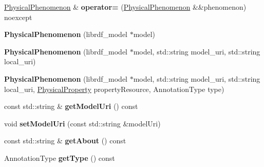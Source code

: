 \begin{DoxyCompactItemize}
\mbox{\label{classomexmeta_1_1PhysicalPhenomenon_af15355b4c2a361b4b02dca02d3877aed}} 
\hyperlink{classomexmeta_1_1PhysicalPhenomenon}{Physical\+Phenomenon} \& {\bfseries operator=} (\hyperlink{classomexmeta_1_1PhysicalPhenomenon}{Physical\+Phenomenon} \&\&phenomenon) noexcept
\item 
\mbox{\label{classomexmeta_1_1PhysicalPhenomenon_aa140516da97b03960175f9bc04ecf865}} 
{\bfseries Physical\+Phenomenon} (librdf\+\_\+model $\ast$model)
\item 
\mbox{\label{classomexmeta_1_1PhysicalPhenomenon_a5c831ca76c36121b0fbc7b122b5539ac}} 
{\bfseries Physical\+Phenomenon} (librdf\+\_\+model $\ast$model, std\+::string model\+\_\+uri, std\+::string local\+\_\+uri)
\item 
\mbox{\label{classomexmeta_1_1PhysicalPhenomenon_a93bf263f7fdb65bd3e8de97983a7186b}} 
{\bfseries Physical\+Phenomenon} (librdf\+\_\+model $\ast$model, std\+::string model\+\_\+uri, std\+::string local\+\_\+uri, \hyperlink{classomexmeta_1_1PhysicalProperty}{Physical\+Property} property\+Resource, Annotation\+Type type)
\item 
\mbox{\label{classomexmeta_1_1PhysicalPhenomenon_a5528b12e5dbc702c0c270328662e7031}} 
const std\+::string \& {\bfseries get\+Model\+Uri} () const
\item 
\mbox{\label{classomexmeta_1_1PhysicalPhenomenon_aa1fd9929fb2e07fa20081b1a4c00c9d2}} 
void {\bfseries set\+Model\+Uri} (const std\+::string \&model\+Uri)
\item 
\mbox{\label{classomexmeta_1_1PhysicalPhenomenon_a8be912d1256d6b913c4965f96f1b730b}} 
const std\+::string \& {\bfseries get\+About} () const
\item 
\mbox{\label{classomexmeta_1_1PhysicalPhenomenon_a9676a1dcc458247a19d19cda16d640f4}} 
Annotation\+Type {\bfseries get\+Type} () const
\item 
\mbox{\label{classomexmeta_1_1PhysicalPhenomenon_ac741cab1f6df58b0de484fc1771ef839}} 

\end{DoxyCompactItemize}
